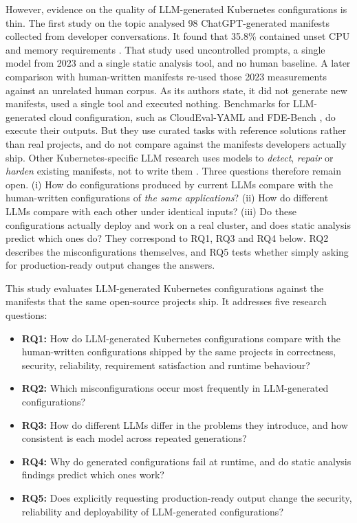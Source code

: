 However, evidence on the quality of LLM-generated Kubernetes configurations is thin. The first study on the topic analysed 98 ChatGPT-generated manifests collected from developer conversations. It found that 35.8\% contained unset CPU and memory requirements \citep{zhang2024genaismells}. That study used uncontrolled prompts, a single model from 2023 and a single static analysis tool, and no human baseline. A later comparison with human-written manifests \citep{jcomsec2026aivshumank8s} re-used those 2023 measurements against an unrelated human corpus. As its authors state, it did not generate new manifests, used a single tool and executed nothing. Benchmarks for LLM-generated cloud configuration, such as CloudEval-YAML \citep{xu2024cloudevalyaml} and FDE-Bench \citep{ding2026fdebench}, do execute their outputs. But they use curated tasks with reference solutions rather than real projects, and do not compare against the manifests developers actually ship. Other Kubernetes-specific LLM research uses models to \emph{detect}, \emph{repair} or \emph{harden} existing manifests, not to write them \citep{malul2024genkubesec,ye2025llmsecconfig,sgancohen2025kubeguard}. Three questions therefore remain open. (i) How do configurations produced by current LLMs compare with the human-written configurations of \emph{the same applications}? (ii) How do different LLMs compare with each other under identical inputs? (iii) Do these configurations actually deploy and work on a real cluster, and does static analysis predict which ones do? They correspond to RQ1, RQ3 and RQ4 below. RQ2 describes the misconfigurations themselves, and RQ5 tests whether simply asking for production-ready output changes the answers.

This study evaluates LLM-generated Kubernetes configurations against the manifests that the same open-source projects ship. It addresses five research questions:
\begin{itemize}
    \item \textbf{RQ1:} How do LLM-generated Kubernetes configurations compare with the human-written configurations shipped by the same projects in correctness, security, reliability, requirement satisfaction and runtime behaviour?
    \item \textbf{RQ2:} Which misconfigurations occur most frequently in LLM-generated configurations?
    \item \textbf{RQ3:} How do different LLMs differ in the problems they introduce, and how consistent is each model across repeated generations?
    \item \textbf{RQ4:} Why do generated configurations fail at runtime, and do static analysis findings predict which ones work?
    \item \textbf{RQ5:} Does explicitly requesting production-ready output change the security, reliability and deployability of LLM-generated configurations?
\end{itemize}

